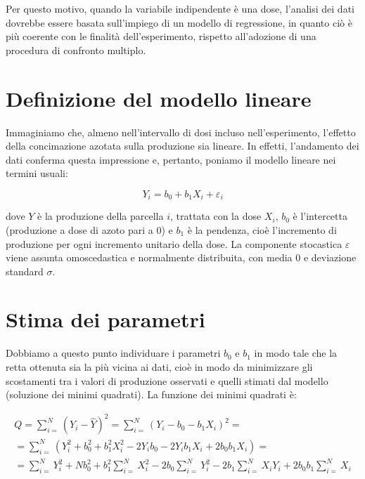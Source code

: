 \documentclass[a4paper,12pt,oneside]{book}
\begin{document}
Per questo motivo, quando la variabile indipendente è una dose, l'analisi dei dati dovrebbe essere basata sull'impiego di un modello di regressione, in quanto ciò è più coerente con le finalità dell'esperimento, rispetto all'adozione di una procedura di confronto multiplo.

\hypertarget{definizione-del-modello-lineare-1}{%
\section{Definizione del modello lineare}\label{definizione-del-modello-lineare-1}}

Immaginiamo che, almeno nell'intervallo di dosi incluso nell'esperimento, l'effetto della concimazione azotata sulla produzione sia lineare. In effetti, l'andamento dei dati conferma questa impressione e, pertanto, poniamo il modello lineare nei termini usuali:

\[Y_i = b_0 + b_1 X_i + \varepsilon_i\]

dove \(Y\) è la produzione della parcella \(i\), trattata con la dose \(X_i\), \(b_0\) è l'intercetta (produzione a dose di azoto pari a 0) e \(b_1\) è la pendenza, cioè l'incremento di produzione per ogni incremento unitario della dose. La componente stocastica \(\varepsilon\) viene assunta omoscedastica e normalmente distribuita, con media 0 e deviazione standard \(\sigma\).

\hypertarget{stima-dei-parametri-3}{%
\section{Stima dei parametri}\label{stima-dei-parametri-3}}

Dobbiamo a questo punto individuare i parametri \(b_0\) e \(b_1\) in modo tale che la retta ottenuta sia la più vicina ai dati, cioè in modo da minimizzare gli scostamenti tra i valori di produzione osservati e quelli stimati dal modello (soluzione dei minimi quadrati). La funzione dei minimi quadrati è:

\[\begin{array}{l}
Q = \sum\limits_{i = }^N {\left( {{Y_i} - \hat Y} \right)^2 = \sum\limits_{i = }^N {{{\left( {{Y_i} - {b_0} - {b_1}{X_i}} \right)}^2}}  = } \\
 = \sum\limits_{i = }^N {\left( {Y_i^2 + b_0^2 + b_1^2X_i^2 - 2{Y_i}{b_0} - 2{Y_i}{b_1}{X_i} + 2{b_0}{b_1}{X_i}} \right)}  = \\
 = \sum\limits_{i = }^N {Y_i^2 + Nb_0^2 + b_1^2\sum\limits_{i = }^N {X_i^2 - 2{b_0}\sum\limits_{i = }^N {Y_i^2 - 2{b_1}\sum\limits_{i = }^N {{X_i}{Y_i} + } } } } 2{b_0}{b_1}\sum\limits_{i = }^N {{X_i}} 
\end{array}\]
\end{document}
